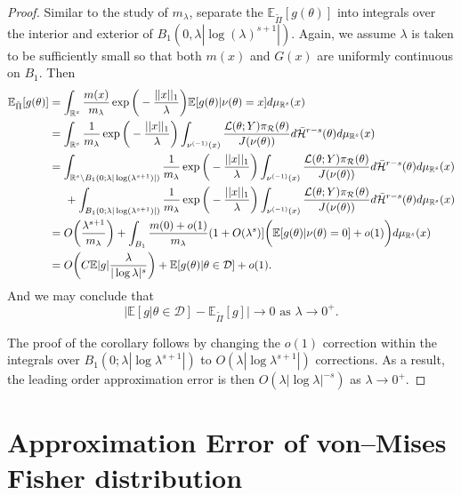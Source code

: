 \documentclass[10pt,fleqn]{article}
\newcommand{\bb}[1]{\mathbb{#1}} \newcommand{\mc}[1]{\mathcal{#1}}
\DeclareMathOperator{\1}{\mathbbm{1}} \DeclareMathOperator{\bigO}{\mc O}
\begin{document}
\begin{proof}
Similar to the study of $m_\lambda$, separate the $\bb E_{\tilde{\Pi}}[g(\theta)]$ into integrals over the interior and exterior of $B_1(0,\lambda|\log(\lambda)^{s+1}|)$. Again, we assume $\lambda$ is taken to be sufficiently small so that both $m(x)$ and $G(x)$ are uniformly continuous on $B_1$. Then 
\begin{align*}
\bb E_{\tilde{\Pi}}[g(\theta)] &= \int_{\mathbb{R}^s} \frac{m(x)}{m_\lambda}\exp\bigg(-\frac{||x||_1}{\lambda}\bigg)\bb E[g(\theta)|\nu(\theta)=x]d\mu_{\mathbb{R}^s}(x) \\
&= \int_{\mathbb{R}^s} \frac{1}{m_\lambda}\exp\bigg(-\frac{||x||_1}{\lambda}\bigg)\int_{\nu^{(-1)}(x)} \frac{\mathcal{L}(\theta;Y)\pi_\mathcal{R}(\theta)}{J(\nu(\theta))}d\bar{\mathcal{H}}^{r-s}(\theta) d\mu_{\mathbb{R}^s}(x) \\
&=\int_{\mathbb{R}^s \setminus B_1(0;\lambda|\log(\lambda^{s+1})|)} \frac{1}{m_\lambda}\exp\bigg(-\frac{||x||_1}{\lambda}\bigg) \int_{\nu^{(-1)}(x)} \frac{\mathcal{L}(\theta;Y)\pi_\mathcal{R}(\theta)}{J(\nu(\theta))}d\bar{\mathcal{H}}^{r-s}(\theta) d\mu_{\mathbb{R}^s}(x) \\
&\hspace{0.5 cm} + \int_{B_1(0;\lambda|\log(\lambda^{s+1})|)} \frac{1}{m_\lambda}\exp\bigg(-\frac{||x||_1}{\lambda}\bigg) \int_{\nu^{(-1)}(x)} \frac{\mathcal{L}(\theta;Y)\pi_\mathcal{R}(\theta)}{J(\nu(\theta))}d\bar{\mathcal{H}}^{r-s}(\theta)  d\mu_{\mathbb{R}^s}(x) \\
&= O\bigg( \frac{\lambda^{s+1}}{m_\lambda} \bigg) + \int_{B_1} \frac{m(0)+o(1)}{m_\lambda}(1+O(\lambda^s)]\bigg(\bb E[g(\theta)|\nu(\theta)=0] + o(1) \bigg) d\mu_{\mathbb{R}^s}(x)  \\
&= O\bigg( C \bb E|g|\frac{\lambda}{|\log\lambda|^s}\bigg) + \bb E[g(\theta)|\theta \in \mathcal{D}] + o(1).
\end{align*}
And we may conclude that $$\bigg|\bb E[g|\theta\in\mathcal{D}] - \bb E_{\tilde{\Pi}}[g] \bigg| \to 0 \text{ as } \lambda\to0^+.$$

The proof of the corollary follows by changing the $o(1)$ correction within the integrals over $B_1(0;\lambda|\log \lambda^{s+1}|)$ to $O(\lambda |\log \lambda^{s+1}|)$ corrections.  As a result, the leading order approximation error is then $O(\lambda|\log \lambda|^{-s})$ as $\lambda\to 0^+.$
\end{proof}


\section{Approximation Error of von--Mises Fisher distribution}
\end{document}
